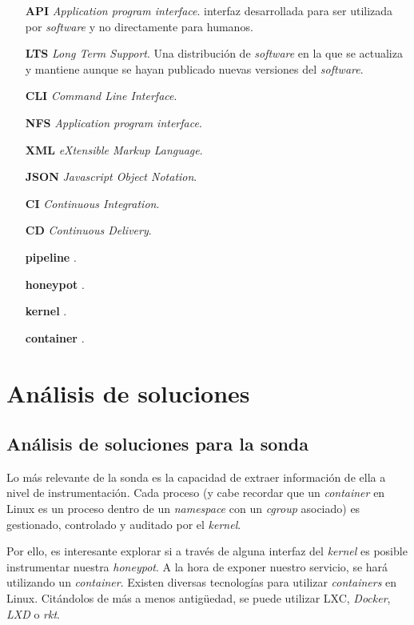 \begin{itemize}
    \item[\textbf{API}] \emph{Application program interface}. interfaz desarrollada para ser utilizada por \emph{software} y no directamente para humanos.
    \item[\textbf{LTS}] \emph{Long Term Support}. Una distribución de \emph{software} en la que se actualiza y mantiene aunque se hayan publicado nuevas versiones del \emph{software}.
    \item[\textbf{CLI}] \emph{Command Line Interface}.
    \item[\textbf{NFS}] \emph{Application program interface}.
    \item[\textbf{XML}] \emph{eXtensible Markup Language}.
    \item[\textbf{JSON}] \emph{Javascript Object Notation}.
    \item[\textbf{CI}] \emph{Continuous Integration}.
    \item[\textbf{CD}] \emph{Continuous Delivery}.
    \item[\textbf{pipeline}] .
    \item[\textbf{honeypot}] .
    \item[\textbf{kernel}] .
    \item[\textbf{container}] .
    
    
    
    
    
    
\end{itemize}

\chapter{An\'alisis de soluciones}
\label{chapter:analisis-de-soluciones}
\minitoc{}


\section{An\'alisis de soluciones para la sonda}
\label{sec:analisis-sonda}


Lo más relevante de la sonda es la capacidad de extraer información de ella a nivel de instrumentación. Cada proceso (y cabe recordar que un \emph{container} en Linux es un proceso dentro de un \emph{namespace} con un \emph{cgroup} asociado) es gestionado, controlado
y auditado por el \emph{kernel}.

Por ello, es interesante explorar si a través de alguna interfaz del \emph{kernel} es posible instrumentar nuestra \emph{honeypot}. A la hora de exponer nuestro servicio, se hará utilizando
un \emph{container}. Existen diversas tecnologías para utilizar \emph{containers} en Linux. Citándolos de más a menos antigüedad, se puede utilizar LXC, \emph{Docker}, \emph{LXD} o \emph{rkt}.

